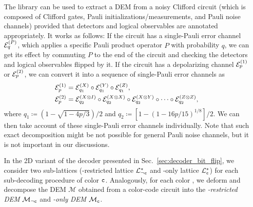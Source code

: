 \documentclass[a4paper,twocolumn,11pt,accepted=2025-01-21]{quantumarticle}
\theoremstyle{definition}
\theoremstyle{definition}
\theoremstyle{definition}
\begin{document}
The \stim library \cite{gidney2021stim} can be used to extract a DEM from a noisy Clifford circuit (which is composed of Clifford gates, Pauli initializations/measurements, and Pauli noise channels) provided that detectors and logical observables are annotated appropriately.
It works as follows:
If the circuit has a single-Pauli error channel $\mathcal{E}_{q}^{(P)}$, which applies a specific Pauli product operator $P$ with probability $q$, we can get its effect by commuting $P$ to the end of the circuit and checking the detectors and logical observables flipped by it.
If the circuit has a depolarizing channel $\mathcal{E}_{p}^{(1)}$ or $\mathcal{E}_{p}^{(2)}$, we can convert it into a sequence of single-Pauli error channels as 
\begin{align*}
    \mathcal{E}_{p}^{(1)} &= \mathcal{E}_{q_1}^{(X)} \circ \mathcal{E}_{q_1}^{(Y)} \circ \mathcal{E}_{q_1}^{(Z)}, \\ 
    \mathcal{E}_{p}^{(2)} &= \mathcal{E}_{q_2}^{(X \otimes I)} \circ \mathcal{E}_{q_2}^{(X \otimes X)} \circ \mathcal{E}_{q_2}^{(X \otimes Y)} \circ \cdots \circ \mathcal{E}_{q_2}^{(Z \otimes Z)},
\end{align*}
where $q_1 \coloneqq (1 - \sqrt{1 - 4p/3})/2$ and $q_2 \coloneqq [1 - (1 - 16p/15)^{1/8}]/2$.
We can then take account of these single-Pauli error channels individually.
Note that such exact decomposition might be not possible for general Pauli noise channels, but it is not important in our discussions.

In the 2D variant of the decoder presented in Sec.~\ref{sec:decoder_bit_flip}, we consider two sub-lattices (\cbs-restricted lattice $\mathcal{L}_{\neg \texttt{c}}^*$ and \cbs-only lattice $\mathcal{L}_{\texttt{c}}^*$) for each sub-decoding procedure of color $\texttt{c}$.
Analogously, for each color \cbs, we deform and decompose the DEM $\mathcal{M}$ obtained from a color-code circuit into the \emph{\cbs-restricted DEM} $\mathcal{M}_{\neg \texttt{c}}$ and \emph{\cbs-only DEM} $\mathcal{M}_{\texttt{c}}$.
\end{document}
